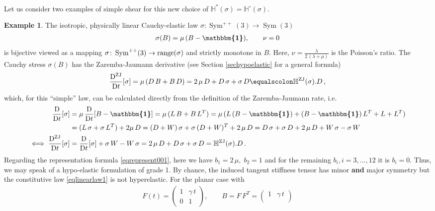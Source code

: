 \documentclass[10pt]{article}
\newcounter{theoremCounter}
\numberwithin{theoremCounter}{section}
\theoremstyle{plain}
\theoremstyle{definition}
\newtheorem{example}[theoremCounter]{Example}
\newcommand{\id}{{\boldsymbol{\mathbbm{1}}}}
\newcommand{\DD}{\mathrm{D}}
\DeclareMathOperator{\Sym}{Sym}
\DeclareMathOperator{\ZJ}{ZJ}
\def\H{\mathbb{H}}
\numberwithin{equation}{section}
\begin{document}
\\
Let us consider two examples of simple shear for this new choice of $\H^*(\sigma) = \H^{\circ}(\sigma)$.
%
\begin{example}
The isotropic, physically linear Cauchy-elastic law $\sigma\colon \Sym^{++}(3) \to \Sym(3)$
	\begin{align}
	\label{eqlinearlaw1}
	\sigma(B) = \mu \, (B - \id), \qquad \nu = 0
	\end{align}
 is bijective viewed as a mapping $\sigma\colon \Sym^{++}(3) \to \textnormal{range}(\sigma)$ and strictly monotone in $B$. Here, $\nu = \frac{\lambda}{2 \, (\lambda + \mu)}$ is the Poisson's ratio. The Cauchy stress $\sigma(B)$ has the Zaremba-Jaumann derivative (see Section \ref{sechypoelastic} for a general formula)
	\begin{align}
	\frac{\DD^{\ZJ}}{\DD t}[\sigma] = \mu \, (D \, B + B \, D) = 2 \, \mu \, D + D \, \sigma + \sigma \, D \equalscolon \H^{\ZJ}(\sigma).D \, ,
	\end{align}
which, for this \enquote{simple} law, can be calculated directly from the definition of the Zaremba-Jaumann rate, i.e.
	\begin{align}
	\frac{\DD}{\DD t}[\sigma] &= \mu \, \frac{\DD}{\DD t}[B- \id] = \mu \, (L \, B + B \, L^T) = \mu \, (L \, (B-\id) + (B-\id) \, L^T + L + L^T) \notag \\
	&= (L \, \sigma + \sigma \, L^T) + 2\mu \, D = (D+W) \, \sigma + \sigma \, (D+W)^T + 2 \, \mu \, D = D \, \sigma + \sigma \, D + 2 \, \mu \, D + W\, \sigma - \sigma \, W \notag \\
	\label{eqsigma1}
	\iff \frac{\DD^{\ZJ}}{\DD t}[\sigma] &= \frac{\DD}{\DD t}[\sigma] + \sigma \, W - W \, \sigma = 2 \, \mu \, D + D \, \sigma + \sigma \, D = \H^{\ZJ}(\sigma) . D \, .
	\end{align}
Regarding the representation formula \eqref{eqrepresent001}, here we have $b_1 = 2 \, \mu, \; b_2 = 1$ and for the remaining $b_i, i=3,...,12$ it is $b_i = 0$. Thus, we may speak of a hypo-elastic formulation of grade 1. By chance, the induced tangent stiffness tensor has minor \textbf{and} major symmetry but the constitutive law \eqref{eqlinearlaw1} is not hyperelastic. For the planar case with
	\begin{align}
	F(t) =
	\begin{pmatrix}
	1 & \gamma \, t \\
	0 & 1
	\end{pmatrix},
	\qquad
	B = F \, F^T =
	\begin{pmatrix}
	1 & \gamma \, t \\

\end{pmatrix}
\end{align}
\end{example}
\end{document}
